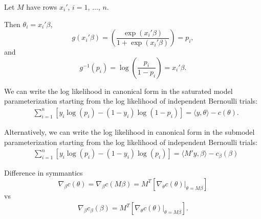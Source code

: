 \documentclass[
  ignorenonframetext,
]{beamer}
\begin{document}
\begin{frame}{}
\protect\hypertarget{section-5}{}
Let \(M\) have rows \(x_i'\), \(i = 1\), \(\ldots\), \(n\).

Then \(\theta_i = x_i'\beta\), \[
  g(x_i'\beta) = \left(\frac{\exp(x_i'\beta)}{ 1 + \exp(x_i'\beta)}\right) = p_i,
\] and \[
  g^{-1}(p_i) = \log\left(\frac{p_i}{1 - p_i}\right) =  x_i'\beta. 
\]
\end{frame}

\begin{frame}{}
\protect\hypertarget{section-6}{}
We can write the log likelihood in canonical form in the saturated model
parameterization starting from the log likelihood of independent
Bernoulli trials: \begin{align*}
  &\sum_{i=1}^n\left[y_i\log(p_i) - (1 - y_i)\log(1 - p_i) \right] 
  = \langle y, \theta \rangle - c(\theta). 
\end{align*}
\end{frame}

\begin{frame}{}
\protect\hypertarget{section-7}{}
Alternatively, we can write the log likelihood in canonical form in the
submodel parameterization starting from the log likelihood of
independent Bernoulli trials: \begin{align*}
  &\sum_{i=1}^n\left[y_i\log(p_i) - (1 - y_i)\log(p_i) \right] 
  = \langle M'y, \beta \rangle - c_\beta(\beta)
\end{align*}
\end{frame}

\begin{frame}{Difference in symmantics}
\protect\hypertarget{difference-in-symmantics}{}
\[
  \nabla_\beta c(\theta) = \nabla_\beta c(M\beta) = M^T\left[\nabla_\theta c(\theta)|_{\theta = M\beta}\right]
\] vs \begin{align*}
   \nabla_\beta c_\beta(\beta) = %
     M^T\left[\nabla_\theta c(\theta)|_{\theta = M\beta}\right].
\end{align*}
\end{frame}
\end{document}

